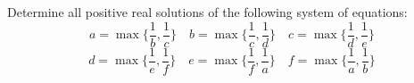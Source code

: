 Determine all positive real solutions of the following system of equations:
$$a=\max\{\frac{1}{b},\frac{1}{c}\} \quad b=\max\{\frac{1}{c},\frac{1}{d}\} \quad c=\max\{\frac{1}{d},\frac{1}{e}\}$$
$$d=\max\{\frac{1}{e},\frac{1}{f}\} \quad e=\max\{\frac{1}{f},\frac{1}{a}\} \quad f=\max\{\frac{1}{a},\frac{1}{b}\}$$
